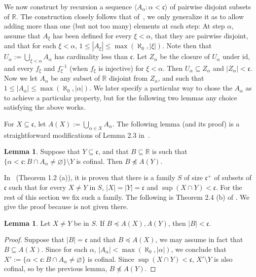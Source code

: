 \documentclass[10pt]{amsart}
\theoremstyle{definition}
\newtheorem{lemma}[theorem]{Lemma}
\theoremstyle{remark}
\newcommand{\es}{\varnothing}
\newcommand{\seb}{\subseteq}
\newcommand{\setm}{\setminus}
\newcommand{\tup}[1]{\langle#1\rangle}
\newcommand{\eleq}{\preceq}
\newcommand{\neleq}{\npreceq}
\newcommand{\1}{\mathbbm{1}}
\newcommand{\cc}{\mathfrak{c}}
\begin{document}
We now construct by recursion
a sequence $\tup{A_{\alpha} : \alpha < \cc}$ of pairwise disjoint
subsets of $\mathbb{R}$. The construction closely follows
that of~\cite{Baumgartner1982}, we only generalize it as to allow
adding more than one (but not too many) elements at each step:
At step $\alpha$, assume that $A_{\xi}$ has been defined for every $\xi < \alpha$,
that they are pairwise disjoint, and that for each $\xi < \alpha$,
$1 \le |A_{\xi}| \le \max(\aleph_{0},|\xi|)$. Note then
that $U_{\alpha} := \bigcup_{\xi < \alpha}A_{\alpha}$ has cardinality less
than $\cc$. Let $Z_{\alpha}$ be the closure of $U_{\alpha}$ under $\mathrm{id}$,
and every $f_{\xi}$ and $f_{\xi}^{-1}$ (when $f_{\xi}$ is injective)
for $\xi < \alpha$. Then $U_{\alpha} \seb Z_{\alpha}$ and $|Z_{\alpha}| < \cc$.
Now we let $A_{\alpha}$ be any subset of $\mathbb{R}$ disjoint from $Z_{\alpha}$,
and such that $1 \le |A_{\alpha}| \le \max(\aleph_{0},|\alpha|)$. We later
specify a particular way to chose the $A_{\alpha}$ as to achieve a particular
property, but for the following two lemmas any choice satisfying the above works.

For $X \seb \cc$, let $A(X) := \bigcup_{\alpha \in X}A_{\alpha}$. The following
lemma (and its proof) is a straightforward modifications of Lemma 2.3
in~\cite{Baumgartner1982}.

\begin{lemma}
  Suppose that $Y \seb \cc$, and that $B \seb \mathbb{R}$ is such that
  $\{\alpha < \cc : B \cap A_{\alpha} \neq \es\} \setm Y$ is cofinal.
  Then $B \neleq A(Y)$.
\end{lemma}

In~\cite{Baumgartner1982} (Theorem 1.2 (a)), it is proven that there is
a family $S$ of size $\cc^{+}$ of subsets of $\cc$ such that for every
$X \neq Y$ in $S$, $|X| = |Y| = \cc$ and $\sup(X\cap Y) < \cc$. For
the rest of this section we fix such a family. The following
is Theorem 2.4 (b) of \cite{Baumgartner1982}. We give the proof because
is not given there.

\begin{lemma}
  Let $X \neq Y$ be in $S$. If $B \eleq A(X), A(Y)$, then $|B| < \cc$.
\end{lemma}
\begin{proof}
  Suppose that $|B| = \cc$ and that $B \eleq A(X)$, we may assume in fact that
  $B \seb A(X)$. Since for each $\alpha$,
  $|A_{\alpha}| < \max(\aleph_{0},|\alpha|)$, we conclude that
  $X' := \{\alpha < \cc : B \cap A_{\alpha} \neq \es\}$ is cofinal. Since
  $\sup(X \cap Y) < \cc$, $X' \setm Y$ is also cofinal, so by
  the previous lemma, $B \neleq A(Y)$.
\end{proof}
\end{document}
